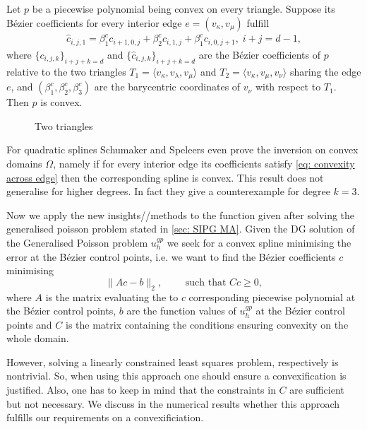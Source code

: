 \begin{theorem}
	Let $p$ be a piecewise polynomial being convex on every triangle. Suppose its B\'ezier coefficients for every interior edge $e =(v_\kappa, v_\mu)$ fulfill 
	\begin{align}
		{\hat c_{i,j,1}} = \beta_1^c c_{i+1, 0,j} +\beta_2^c c_{i,1,j} + \beta_1^c c_{i, 0,j+1}, \; i+j=d-1, \label{eq: convexity across edge}
	\end{align}
where  $\{c_{i,j,k}\}_{i+j+k=d}$ and $\{ {\hat c_{i,j,k}}\}_{i+j+k=d}$ are the B\'ezier coefficients of $p$ relative to the two triangles $T_1 = \langle v_\kappa, v_\lambda, v_\mu \rangle$ and $T_2 = \langle v_\kappa, v_\mu, v_\nu \rangle$ sharing the edge $e$, and $(\beta_1^c,\beta_2^c,\beta_3^c)$ are the barycentric coordinates of $v_\nu$ with respect to $T_1$. Then $p$ is convex.
\end{theorem}

\begin{figure}[h]
	
	\caption{Two triangles}
\end{figure}

For quadratic splines Schumaker and Speleers even prove the inversion on convex domains $\Omega$, namely if for every interior edge its coefficients satisfy \eqref{eq: convexity across edge} then the corresponding spline is convex.
This result does not generalise for higher degrees. In fact they give a counterexample for degree $k = 3$.

Now we apply the new insights//methods to the function given after solving the generalised poisson problem stated in \ref{sec: SIPG MA}.
Given the DG solution of the Generalised Poisson problem $u^{gp}_h$ we seek for a convex spline minimising the error at the B\'ezier control points, i.e. we want to find the B\'ezier coefficients $c$ minimising
\[
		\lVert A c - b \rVert_2, \qquad \text{ such that } Cc \geq 0,
\]
where $A$ is the matrix evaluating the to $c$ corresponding piecewise polynomial at the B\'ezier control points, $b$ are the function values of $u^{gp}_h$ at the B\'ezier control points and $C$ is the matrix containing the conditions ensuring convexity on the whole domain.

However, solving a linearly constrained least squares problem, respectively is nontrivial. So, when using this approach one should ensure a convexification is justified. Also, one has to keep in mind that the constraints in $C$ are sufficient but not necessary. We discuss in the numerical results whether this approach fulfills our requirements on a convexificiation.

